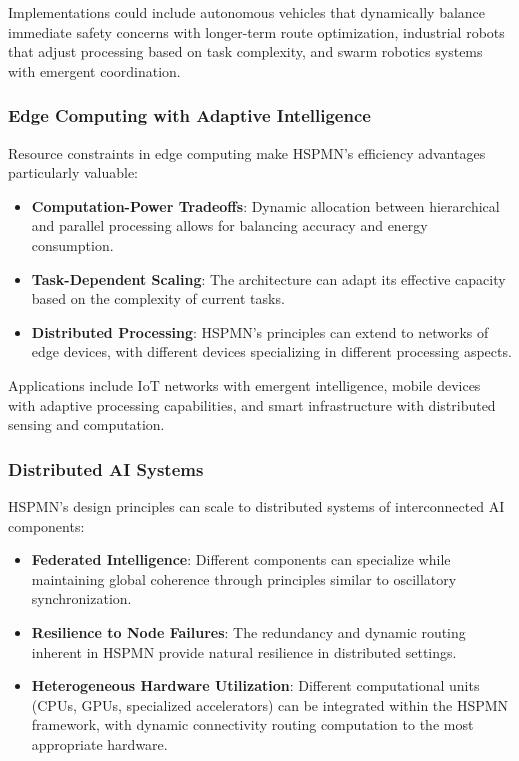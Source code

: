 \documentclass[11pt,a4paper,twocolumn]{article}
\begin{document}
Implementations could include autonomous vehicles that dynamically balance immediate safety concerns with longer-term route optimization, industrial robots that adjust processing based on task complexity, and swarm robotics systems with emergent coordination.

\subsubsection{Edge Computing with Adaptive Intelligence}

Resource constraints in edge computing make HSPMN's efficiency advantages particularly valuable:

\begin{itemize}
    \item \textbf{Computation-Power Tradeoffs}: Dynamic allocation between hierarchical and parallel processing allows for balancing accuracy and energy consumption.
    \item \textbf{Task-Dependent Scaling}: The architecture can adapt its effective capacity based on the complexity of current tasks.
    \item \textbf{Distributed Processing}: HSPMN's principles can extend to networks of edge devices, with different devices specializing in different processing aspects.
\end{itemize}

Applications include IoT networks with emergent intelligence, mobile devices with adaptive processing capabilities, and smart infrastructure with distributed sensing and computation.

\subsubsection{Distributed AI Systems}

HSPMN's design principles can scale to distributed systems of interconnected AI components:

\begin{itemize}
    \item \textbf{Federated Intelligence}: Different components can specialize while maintaining global coherence through principles similar to oscillatory synchronization.
    \item \textbf{Resilience to Node Failures}: The redundancy and dynamic routing inherent in HSPMN provide natural resilience in distributed settings.
    \item \textbf{Heterogeneous Hardware Utilization}: Different computational units (CPUs, GPUs, specialized accelerators) can be integrated within the HSPMN framework, with dynamic connectivity routing computation to the most appropriate hardware.
\end{itemize}
\end{document}
